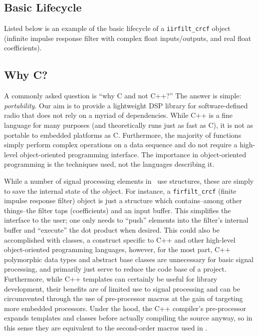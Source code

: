 \subsection{Basic Lifecycle}
\label{section:data_structures:lifecycle}

Listed below is an example of the basic lifecycle of a
{\tt iirfilt\_crcf} object (infinite impulse response filter with
complex float inputs/outputs, and real float coefficients).



\subsection{Why C?}
A commonly asked question is ``why C and not C++?''
The answer is simple: {\em portability}.
Our aim is to provide a lightweight DSP library for software-defined radio
that does not rely on a myriad of dependencies.
While C++ is a fine language for many purposes (and theoretically runs just as
fast as C), it is not as portable to embedded platforms as C.
Furthermore, the majority of functions simply perform complex operations on a
data sequence and do not require a high-level object-oriented programming
interface.
The importance in object-oriented programming is the techniques used, not the
languages describing it.

While a number of signal processing elements in \liquid\ use structures, these
are simply to save the internal state of the object.
For instance, a {\tt firfilt\_crcf} (finite impulse response filter) object
is just a structure which contains--among other things--the filter taps
(coefficients) and an input buffer.
This simplifies the interface to the user; one only needs to ``push'' elements
into the filter's internal buffer and ``execute'' the dot product when
desired.
This could also be accomplished with classes, a construct specific to C++ and
other high-level object-oriented programming languages, however,
for the most part, C++ polymorphic data types and abstract base classes are
unnecessary for basic signal processing, and primarily just serve to reduce
the code base of a project.
Furthermore, while C++ templates can certainly be useful for library development,
their benefits are of limited use to signal processing and can be circumvented
through the use of pre-processor macros at the gain of targeting more embedded
processors.
Under the hood, the C++ compiler's pre-processor expands templates and classes
before actually compiling the source anyway, so in this sense they are
equivalent to the second-order macros used in \liquid.

